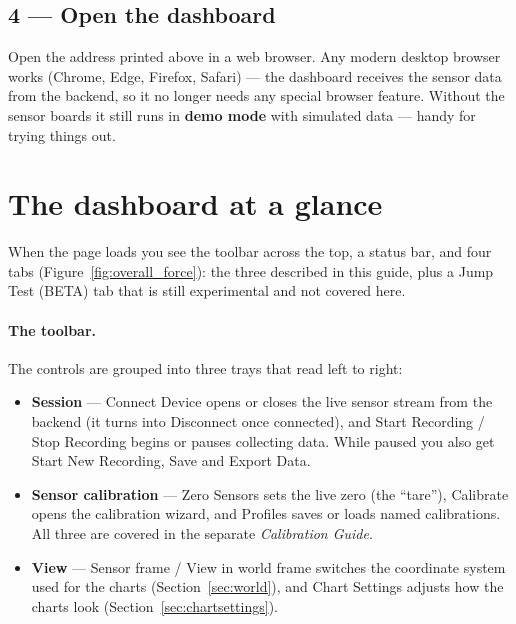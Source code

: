 \documentclass[11pt,a4paper]{article}
\begin{document}
\subsection*{4 --- Open the dashboard}
Open the address printed above in a web browser. Any modern desktop browser works
(Chrome, Edge, Firefox, Safari) --- the dashboard receives the sensor data from the
backend, so it no longer needs any special browser feature. Without the sensor
boards it still runs in \textbf{demo mode} with simulated data --- handy for trying
things out.

\section{The dashboard at a glance}

When the page loads you see the toolbar across the top, a status bar, and four
tabs (Figure~\ref{fig:overall_force}): the three described in this guide, plus a
\textsf{Jump Test (BETA)} tab that is still experimental and not covered here.


\paragraph{The toolbar.} The controls are grouped into three trays that read left
to right:
\begin{itemize}[leftmargin=1.4em]
  \item \textbf{Session} --- \textsf{Connect Device} opens or closes the live
        sensor stream from the backend (it turns into \textsf{Disconnect} once
        connected), and
        \textsf{Start Recording} / \textsf{Stop Recording} begins or pauses
        collecting data. While paused you also get \textsf{Start New Recording},
        \textsf{Save} and \textsf{Export Data}.
  \item \textbf{Sensor calibration} --- \textsf{Zero Sensors} sets the live zero
        (the ``tare''), \textsf{Calibrate} opens the calibration wizard, and
        \textsf{Profiles} saves or loads named calibrations. All three are covered
        in the separate \emph{Calibration Guide}.
  \item \textbf{View} --- \textsf{Sensor frame / View in world frame} switches the
        coordinate system used for the charts (Section~\ref{sec:world}), and
        \textsf{Chart Settings} adjusts how the charts look
        (Section~\ref{sec:chartsettings}).
\end{itemize}
\end{document}
